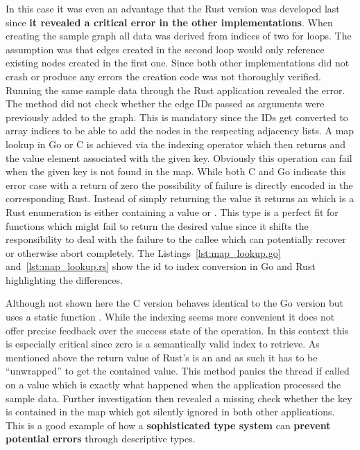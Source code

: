 In this case it was even an advantage that the Rust version was developed last since \textbf{it revealed a critical error in the other implementations}. When creating the sample graph all data was derived from indices of two for loops. The assumption was that edges created in the second loop would only reference existing nodes created in the first one. Since both other implementations did not crash or produce any errors the creation code was not thoroughly verified. Running the same sample data through the Rust application revealed the error. The  method did not check whether the edge IDs passed as arguments were previously added to the graph. This is mandatory since the IDs get converted to array indices to be able to add the nodes in the respecting adjacency lists. A map lookup in Go or C is achieved via the indexing operator which then returns and the value element associated with the given key. Obviously this operation can fail when the given key is not found in the map. While both C and Go indicate this error case with a return of zero the possibility of failure is directly encoded in the corresponding Rust. Instead of simply returning the value it returns an  which is a Rust enumeration is either containing a value or . This type is a perfect fit for functions which might fail to return the desired value since it shifts the responsibility to deal with the failure to the callee which can potentially recover or otherwise abort completely. The Listings~\ref{lst:map_lookup.go} and~\ref{lst:map_lookup.rs} show the id to index conversion in Go and Rust highlighting the differences.
\\

\newpage


Although not shown here the C version behaves identical to the Go version but uses a static function . While the indexing seems more convenient it does not offer precise feedback over the success state of the operation. In this context this is especially critical since zero is a semantically valid index to retrieve. As mentioned above the return value of Rust's  is an  and as such it has to be ``unwrapped'' to get the contained value. This method panics the thread if called on a  value which is exactly what happened when the application processed the sample data. Further investigation then revealed a missing check whether the key is contained in the map which got silently ignored in both other applications. This is a good example of how a \textbf{sophisticated type system} can \textbf{prevent potential errors} through descriptive types.


